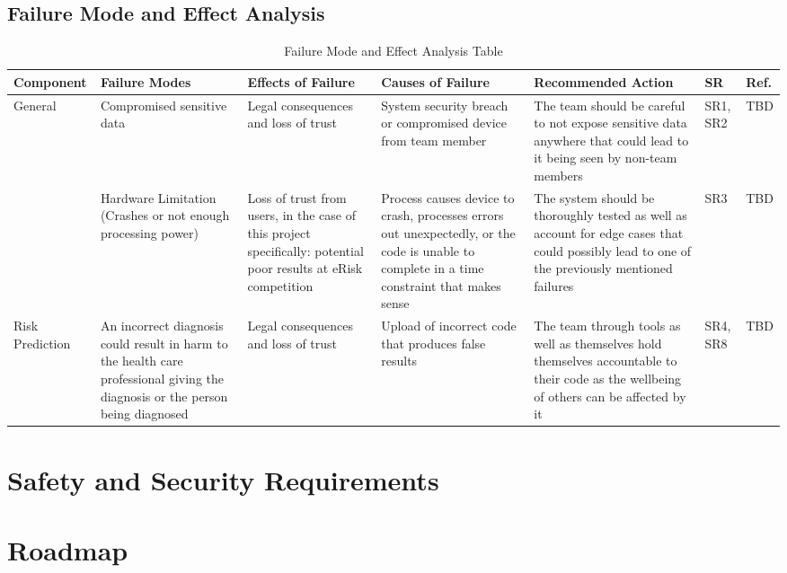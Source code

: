 \documentclass{article}
\begin{document}
\begin{landscape}
    \section{Failure Mode and Effect Analysis}
    \begin{longtable}{|p{}|p{}|p{}|p{}|p{}|p{}|p{}|}
        \caption{Failure Mode and Effect Analysis Table} \\
        \hline
        \textbf{Component} & \textbf{Failure Modes} & \textbf{Effects of Failure} & \textbf{Causes of Failure} & \textbf{Recommended Action} & \textbf{SR} & \textbf{Ref.} \\
        \hline
        \multirow{2}{*}{General} 
        & Compromised sensitive data
        & Legal consequences and loss of trust 
        & System security breach or compromised device from team member 
        & The team should be careful to not expose sensitive data anywhere that could lead to it being seen by non-team members 
        & SR1, SR2
        & TBD \\
        \cline{2-7}
        & Hardware Limitation (Crashes or not enough processing power)
        & Loss of trust from users, in the case of this project specifically: potential poor results at eRisk competition
        & Process causes device to crash, processes errors out unexpectedly, or the code is unable to complete in a time constraint that makes sense 
        & The system should be thoroughly tested as well as account for edge cases that could possibly lead to one of the previously mentioned failures  
        & SR3 
        & TBD \\
        \hline
        \multirow{1}{*}{Risk Prediction} 
        & An incorrect diagnosis could result in harm to the health care professional giving the diagnosis or the person being diagnosed
        & Legal consequences and loss of trust 
        & Upload of incorrect code that produces false results
        & The team through tools as well as themselves hold themselves accountable to their code as the wellbeing of others can be affected by it
        & SR4, SR8
        & TBD \\
        \hline
    \end{longtable}
\end{landscape}


\section{Safety and Security Requirements}


\section{Roadmap}

\end{document}
